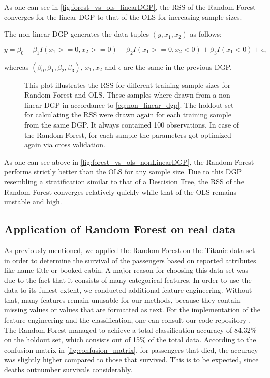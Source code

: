 As one can see in \autoref{fig:forest_vs_ols_linearDGP}, the RSS of the Random Forest converges for the linear DGP
to that of the OLS for increasing sample sizes. 

The non-linear DGP generates the data tuples \( (y, x_{1}, x_{2}) \) as follows:

\begin{equation}\label{eq:non_linear_dgp}
    y = \beta_{0} + \beta_{1} I(x_{1} >= 0, x_{2} >= 0) + \beta_{2} I(x_{1} >= 0, x_{2} < 0) + \beta_{3} I(x_{1} < 0) + \epsilon,
\end{equation}

whereas \( (\beta_{0}, \beta_{1}, \beta_{2}, \beta_{3}) \), \( x_{1}, x_{2} \) and \(  \epsilon \)
are the same in the previous DGP.

\begin{figure}[H]
    \captionsetup{format=plain}
    \caption
        {This plot illustrates the RSS for different training sample sizes for Random Forest and OLS.
        These samples where drawn from a non-linear DGP in accordance to \autoref{eq:non_linear_dgp}.
        The holdout set for calculating the RSS were drawn again for each training sample from the same DGP.
        It always contained 100 observations. In case of the Random Forest, for each sample the parameters
        got optimized again via cross validation.
        }
    \label{fig:forest_vs_ols_nonLinearDGP}
\end{figure}

As one can see above in \autoref{fig:forest_vs_ols_nonLinearDGP}, the Random Forest performs strictly better
than the OLS for any sample size. Due to this DGP resembling a stratification similar to
that of a Descision Tree, the RSS of the Random Forest converges relatively quickly while that of the OLS
remains unstable and high. 


\subsection{Application of Random Forest on real data}
\label{sec:real_data}
As previously mentioned, we applied the Random Forest on the Titanic data set \cite{titanicData} in order
to determine the survival of the passengers based on reported attributes like name title or booked cabin.
A major reason for choosing this data set was due to the fact that it consists of many categorical features.
In order to use the data to its fullest extent, we conducted additional feature engineering. 
Without that, many features remain unusable for our methods, 
because they contain missing values or values that are formatted as text.
For the implementation of the feature engineering and the classification,
one can consult our code repository \cite{githubApplication}.
The Random Forest managed to achieve a total classification accuracy of 84,32\% on the holdout set,
which consists out of 15\% of the total data.
According to the confusion matrix in \autoref{fig:confusion_matrix}, for passengers that died, 
the accuracy was slightly higher compared to those that survived. This is to be expected,
since deaths outnumber survivals considerably.

